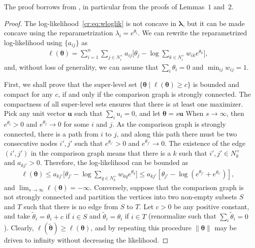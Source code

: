 The proof borrows from \citet{hunter2004mm}, in particular from the proofs of Lemmas~$1$ and~$2$.

\begin{proof}
The log-likelihood~\eqref{cr:eq:wloglik} is not concave in $\bm{\lambda}$, but it can be made concave using the reparametrization $\lambda_i = e^{\theta_i}$.
We can rewrite the reparametrized log-likelihood using $\{ a_{ij} \}$ as
\begin{align*}
    \ell(\bm{\theta})
        = \sum_{i = 1}^n \sum_{j \in N^+_i} a_{ij} \bigg[ \theta_j - \log \sum_{k \in N^+_i} w_{ik} e^{\theta_k} \bigg],
\end{align*}
and, without loss of generality, we can assume that $\sum_i \theta_i = 0$ and $\min_{ij} w_{ij} = 1$.

First, we shall prove that the super-level set $\{ \bm{\theta} \mid \ell(\bm{\theta}) \ge c \}$ is bounded and compact for any $c$, if and only if the comparison graph is strongly connected.
The compactness of all super-level sets ensures that there is at least one maximizer.
Pick any unit vector $\bm{u}$ such that $\sum_i u_i = 0$, and let $\bm{\theta} = s \bm{u}$
When $s \to \infty$, then $e^{\theta_i} > 0$ and $e^{\theta_j} \to 0 $ for some $i$ and $j$.
As the comparison graph is strongly connected, there is a path from $i$ to $j$, and along this path there must be two consecutive nodes $i', j'$ such that $e^{\theta_{i'}} > 0$ and $e^{\theta_{j'}} \to 0$.
The existence of the edge $(i',j')$ in the comparison graph means that there is a $k$ such that $i', j' \in N^+_k$ and $a_{kj'} > 0$.
Therefore, the log-likelihood can be bounded as
\begin{align*}
\ell(\bm{\theta})
    \le a_{kj'} \bigg[ \theta_{j'} - \log \sum_{q \in N^+_k} w_{kq} e^{\theta_q} \bigg]
    \le a_{kj'} \left[ \theta_{j'} - \log (e^{\theta_{j'}} + e^{\theta_{i'}}) \right],
\end{align*}
and $\lim_{s \to \infty} \ell(\bm{\theta}) = -\infty$.
Conversely, suppose that the comparison graph is not strongly connected and partition the vertices into two non-empty subsets $S$ and $T$ such that there is no edge from $S$ to $T$.
Let $c > 0$ be any positive constant, and take $\tilde{\theta}_i = \theta_i + c$ if $i \in S$ and $\tilde{\theta}_i = \theta_i$ if $i \in T$ (renormalize such that $\sum_i \tilde{\theta}_i = 0$).
Clearly, $\ell(\tilde{\bm{\theta}}) \ge \ell(\bm{\theta})$, and by repeating this procedure $\lVert \bm{\theta} \rVert$ may be driven to infinity without decreasing the likelihood.


\end{proof}
